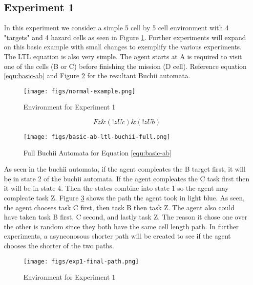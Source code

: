 \documentclass[letter paper, 10 pt, conference]{ieeeconf}
\begin{document}
\subsection{Experiment 1}
In this experiment we consider a simple 5 cell by 5 cell environment with 4 "targets" and 4 hazard cells as seen in Figure \ref{fig:env1}. Further experiments will expand on this basic example with small changes to exemplify the various experiments. The LTL equation is also very simple. The agent starts at A is required to visit one of the cells (B or C) before finishing the mission (D cell). Reference equation \ref{equ:basic-ab} and Figure \ref{fig:buchii-basic-ab} for the resultant Buchii automata.

\begin{figure}[htb]
  \centering
  \texttt{[image: figs/normal-example.png]}
  \caption{Environment for Experiment 1}
  \label{fig:env1}
\end{figure}

\begin{equation}
  Fz \& (!z U c) \& (!z U b)
  \label{equ:basic-ab}
\end{equation}

\begin{figure}[htb]
  \centering
  \texttt{[image: figs/basic-ab-ltl-buchii-full.png]}
  \caption{Full Buchii Automata for Equation \ref{equ:basic-ab}}
  \label{fig:buchii-basic-ab}
\end{figure}

As seen in the buchii automata, if the agent compleates the B target first, it will be in state 2 of the buchii automata. If the agent compleates the C task first then it will be in state 4. Then the states combine into state 1 so the agent may compleate task Z. Figure \ref{fig:exp1-final-path} shows the path the agent took in light blue. As seen, the agent chooses task C first, then task B then task Z. The agent also could have taken task B first, C second, and lastly task Z. The reason it chose one over the other is random since they both have the same cell length path. In further experiments, a asynconosous shorter path will be created to see if the agent chooses the shorter of the two paths.

\begin{figure}[htb]
  \centering
  \texttt{[image: figs/exp1-final-path.png]}
  \caption{Environment for Experiment 1}
  \label{fig:exp1-final-path}
\end{figure}
\end{document}
